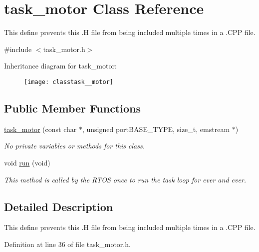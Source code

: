\hypertarget{classtask__motor}{\section{task\-\_\-motor Class Reference}
\label{classtask__motor}
}


This define prevents this .H file from being included multiple times in a .C\-P\-P file.  




{\ttfamily \#include $<$task\-\_\-motor.\-h$>$}

Inheritance diagram for task\-\_\-motor\-:\begin{figure}[H]
\begin{center}
\leavevmode
\texttt{[image: classtask\_\_motor]}
\end{center}
\end{figure}
\subsection*{Public Member Functions}
\begin{DoxyCompactItemize}
\item 
\hyperlink{classtask__motor_a6ed0a0b463e698d636b28bcdd518a027}{task\-\_\-motor} (const char $\ast$, unsigned port\-B\-A\-S\-E\-\_\-\-T\-Y\-P\-E, size\-\_\-t, emstream $\ast$)
\begin{DoxyCompactList}\small\item\em No private variables or methods for this class. \end{DoxyCompactList}\item 
void \hyperlink{classtask__motor_a895a075ec470c9d5a07b8959de06aacd}{run} (void)
\begin{DoxyCompactList}\small\item\em This method is called by the R\-T\-O\-S once to run the task loop for ever and ever. \end{DoxyCompactList}\end{DoxyCompactItemize}


\subsection{Detailed Description}
This define prevents this .H file from being included multiple times in a .C\-P\-P file. 

Definition at line 36 of file task\-\_\-motor.\-h.



